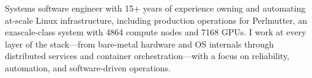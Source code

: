 
\begin{cvparagraph}
  Systems software engineer with 15+ years of experience owning and automating at-scale Linux infrastructure,
  including production operations for Perlmutter, an exascale-class system with 4864 compute nodes and 7168 GPUs.
  I work at every layer of the stack—from bare-metal hardware and OS internals through distributed services and container orchestration—with
  a focus on reliability, automation, and software-driven operations.
\end{cvparagraph}

\vspace{-.3cm}
\begin{cvskills}
\end{cvskills}
